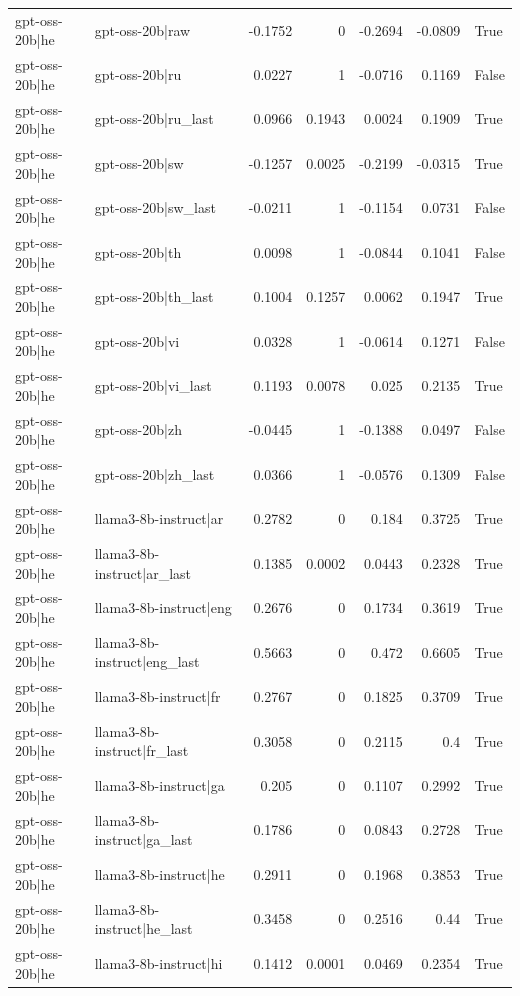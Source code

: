 \begin{table}
\begin{tabular}{l l r r r r l}
gpt-oss-20b|he & gpt-oss-20b|raw & -0.1752 & 0 & -0.2694 & -0.0809 & True \\
gpt-oss-20b|he & gpt-oss-20b|ru & 0.0227 & 1 & -0.0716 & 0.1169 & False \\
gpt-oss-20b|he & gpt-oss-20b|ru_last & 0.0966 & 0.1943 & 0.0024 & 0.1909 & True \\
gpt-oss-20b|he & gpt-oss-20b|sw & -0.1257 & 0.0025 & -0.2199 & -0.0315 & True \\
gpt-oss-20b|he & gpt-oss-20b|sw_last & -0.0211 & 1 & -0.1154 & 0.0731 & False \\
gpt-oss-20b|he & gpt-oss-20b|th & 0.0098 & 1 & -0.0844 & 0.1041 & False \\
gpt-oss-20b|he & gpt-oss-20b|th_last & 0.1004 & 0.1257 & 0.0062 & 0.1947 & True \\
gpt-oss-20b|he & gpt-oss-20b|vi & 0.0328 & 1 & -0.0614 & 0.1271 & False \\
gpt-oss-20b|he & gpt-oss-20b|vi_last & 0.1193 & 0.0078 & 0.025 & 0.2135 & True \\
gpt-oss-20b|he & gpt-oss-20b|zh & -0.0445 & 1 & -0.1388 & 0.0497 & False \\
gpt-oss-20b|he & gpt-oss-20b|zh_last & 0.0366 & 1 & -0.0576 & 0.1309 & False \\
gpt-oss-20b|he & llama3-8b-instruct|ar & 0.2782 & 0 & 0.184 & 0.3725 & True \\
gpt-oss-20b|he & llama3-8b-instruct|ar_last & 0.1385 & 0.0002 & 0.0443 & 0.2328 & True \\
gpt-oss-20b|he & llama3-8b-instruct|eng & 0.2676 & 0 & 0.1734 & 0.3619 & True \\
gpt-oss-20b|he & llama3-8b-instruct|eng_last & 0.5663 & 0 & 0.472 & 0.6605 & True \\
gpt-oss-20b|he & llama3-8b-instruct|fr & 0.2767 & 0 & 0.1825 & 0.3709 & True \\
gpt-oss-20b|he & llama3-8b-instruct|fr_last & 0.3058 & 0 & 0.2115 & 0.4 & True \\
gpt-oss-20b|he & llama3-8b-instruct|ga & 0.205 & 0 & 0.1107 & 0.2992 & True \\
gpt-oss-20b|he & llama3-8b-instruct|ga_last & 0.1786 & 0 & 0.0843 & 0.2728 & True \\
gpt-oss-20b|he & llama3-8b-instruct|he & 0.2911 & 0 & 0.1968 & 0.3853 & True \\
gpt-oss-20b|he & llama3-8b-instruct|he_last & 0.3458 & 0 & 0.2516 & 0.44 & True \\
gpt-oss-20b|he & llama3-8b-instruct|hi & 0.1412 & 0.0001 & 0.0469 & 0.2354 & True \\

\end{tabular}
\end{table}
